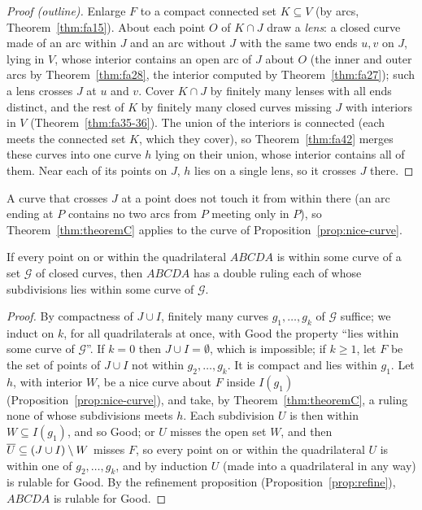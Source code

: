 \begin{proof}[Proof (outline)]
Enlarge $F$ to a compact connected set $K\subseteq V$ (by arcs, Theorem~\ref{thm:fa15}). About each point $O$ of $K\cap J$ draw a
\emph{lens}: a closed curve made of an arc within $J$ and an arc without $J$ with the same two ends $u,v$ on $J$, lying in $V$, whose
interior contains an open arc of $J$ about $O$ (the inner and outer arcs by Theorem~\ref{thm:fa28}, the interior computed by
Theorem~\ref{thm:fa27}); such a lens crosses $J$ at $u$ and $v$. Cover $K\cap J$ by finitely many lenses with all ends distinct, and the
rest of $K$ by finitely many closed curves missing $J$ with interiors in $V$ (Theorem~\ref{thm:fa35-36}). The union of the interiors is
connected (each meets the connected set $K$, which they cover), so Theorem~\ref{thm:fa42} merges these curves into one curve $h$ lying on
their union, whose interior contains all of them. Near each of its points on $J$, $h$ lies on a single lens, so it crosses $J$ there.
\end{proof}


A curve that crosses $J$ at a point does not touch it from within there (an arc ending at $P$ contains no two arcs from $P$ meeting only
in $P$), so Theorem~\ref{thm:theoremC} applies to the curve of Proposition~\ref{prop:nice-curve}.

\begin{theorem}\label{thm:theoremD}
If every point on or within the quadrilateral $ABCDA$ is within some curve of a set $\mathcal G$ of closed curves, then $ABCDA$ has a double
ruling each of whose subdivisions lies within some curve of $\mathcal G$.
\end{theorem}

\begin{proof}
By compactness of $J\cup I$, finitely many curves $g_1,\dots,g_k$ of $\mathcal G$ suffice; we induct on $k$, for all quadrilaterals at once,
with Good the property ``lies within some curve of $\mathcal G$''. If $k=0$ then $J\cup I=\emptyset$, which is impossible; if $k\ge1$, let
$F$ be the set of points of $J\cup I$ not within $g_2,\dots,g_k$. It is compact and lies within $g_1$. Let $h$, with interior $W$, be a
nice curve about $F$ inside $I(g_1)$ (Proposition~\ref{prop:nice-curve}), and take, by Theorem~\ref{thm:theoremC}, a ruling none of whose
subdivisions meets $h$. Each subdivision $U$ is then within $W\subseteq I(g_1)$, and so Good; or $U$ misses the open set $W$, and then $\overline{U}\subseteq(J\cup I)\setminus W$ misses $F$, so every point on or within the
quadrilateral $U$ is within one of $g_2,\dots,g_k$, and by induction $U$ (made into a quadrilateral in any way) is rulable for Good. By the refinement proposition
(Proposition~\ref{prop:refine}), $ABCDA$ is rulable for Good.
\end{proof}

